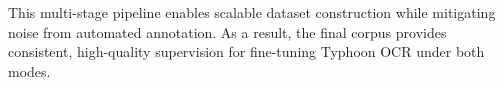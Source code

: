 \documentclass[]{typhoon} %
\begin{document}
This multi-stage pipeline enables scalable dataset construction while mitigating noise from automated annotation. As a result, the final corpus provides consistent, high-quality supervision for fine-tuning Typhoon OCR under both modes.









\end{document}
